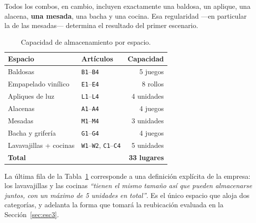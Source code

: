 \documentclass[10pt,a4paper]{article}
\newcommand{\art}[1]{\texttt{#1}}
\newcommand{\cita}[1]{\emph{``#1''}}
\begin{document}
Todos los combos, en cambio, incluyen exactamente una baldosa, un aplique, una
alacena, \textbf{una mesada}, una bacha y una cocina. Esa regularidad —en
particular la de las mesadas— determina el resultado del primer escenario.

\begin{table}[H]
\centering\small
\caption{Capacidad de almacenamiento por espacio.}
\label{tab:capacidad}
\begin{tabular}{llr}
\toprule
\textbf{Espacio} & \textbf{Artículos} & \textbf{Capacidad} \\
\midrule
Baldosas                & \art{B1}--\art{B4}                        & 5 juegos \\
Empapelado vinílico     & \art{E1}--\art{E4}                        & 8 rollos \\
Apliques de luz         & \art{L1}--\art{L4}                        & 4 unidades \\
Alacenas                & \art{A1}--\art{A4}                        & 4 juegos \\
Mesadas                 & \art{M1}--\art{M4}                        & 3 unidades \\
Bacha y grifería        & \art{G1}--\art{G4}                        & 4 juegos \\
Lavavajillas + cocinas  & \art{W1}--\art{W2}, \art{C1}--\art{C4}    & 5 unidades \\
\midrule
\textbf{Total} & & \textbf{33 lugares} \\
\bottomrule
\end{tabular}
\end{table}

La última fila de la Tabla~\ref{tab:capacidad} corresponde a una definición
explícita de la empresa: los lavavajillas y las cocinas \cita{tienen el mismo
tamaño así que pueden almacenarse juntos, con un máximo de 5 unidades en
total}. Es el único espacio que aloja dos categorías, y adelanta la forma que
tomará la reubicación evaluada en la Sección~\ref{sec:esc3}.
\end{document}
